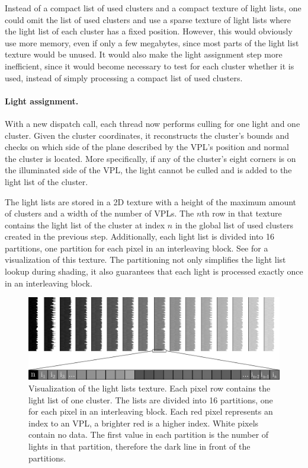 Instead of a compact list of used clusters and a compact texture of light lists, one could omit the list of used clusters and use a sparse texture of light lists where the light list of each cluster has a fixed position. However, this would obviously use more memory, even if only a few megabytes, since most parts of the light list texture would be unused. It would also make the light assignment step more inefficient, since it would become necessary to test for each cluster whether it is used, instead of simply processing a compact list of used clusters.


\paragraph{Light assignment.}
With a new dispatch call, each thread now performs culling for one light and one cluster. Given the cluster coordinates, it reconstructs the cluster's bounds and checks on which side of the plane described by the VPL's position and normal the cluster is located. More specifically, if any of the cluster's eight corners is on the illuminated side of the VPL, the light cannot be culled and is added to the light list of the cluster.

The light lists are stored in a 2D texture with a height of the maximum amount of clusters and a width of the number of VPLs. The $n$th row in that texture contains the light list of the cluster at index $n$ in the global list of used clusters created in the previous step. Additionally, each light list is divided into 16 partitions, one partition for each pixel in an interleaving block. See  for a visualization of this texture. The partitioning not only simplifies the light list lookup during shading, it also guarantees that each light is processed exactly once in an interleaving block.

\begin{figure}[h]
    \includegraphics[width=\textwidth]{graphics/light_lists}
    \caption{Visualization of the light lists texture. Each pixel row contains the light list of one cluster. The lists are divided into 16 partitions, one for each pixel in an interleaving block. Each red pixel represents an index to an VPL, a brighter red is a higher index. White pixels contain no data. The first value in each partition is the number of lights in that partition, therefore the dark line in front of the partitions.}
    \label{fig:impl:light_lists}
\end{figure}

